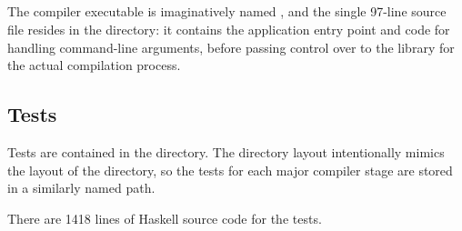 \documentclass[dissertation.tex]{subfiles}
\begin{document}
{    \subsection{}
    {
        \begin{minipage}{0.7\textwidth}
        \vspace{0pt}
        The compiler executable is imaginatively named , and the single 97-line source file  resides in the  directory: it contains the application entry point and code for handling command-line arguments, before passing control over to the  library for the actual compilation process.
        \end{minipage}
        \hspace{5mm}
        \begin{minipage}{0.2\textwidth}
        \vspace{-1.5cm}
        \footnotesize
        \raisebox{-\height}{\directorystructure{
        [app/
            [Main.hs]
        ]
        }}
        \end{minipage}
    }
    \subsection{Tests}
    {
        \begin{minipage}{0.7\textwidth}
        \vspace{-6.5cm}
        Tests are contained in the  directory. The directory layout intentionally mimics the layout of the  directory, so the tests for each major compiler stage are stored in a similarly named path.

        There are 1418 lines of Haskell source code for the tests.
        \end{minipage}
        \hspace{5mm}
        \begin{minipage}{0.2\textwidth}
        \vspace{0pt}
        \footnotesize
        \end{minipage}
    }
}
\end{document}
